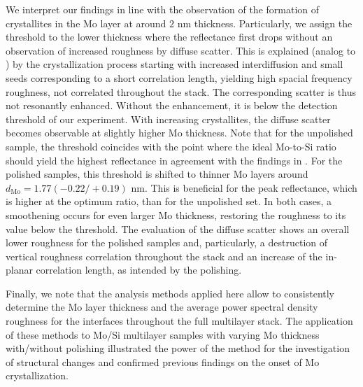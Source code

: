 We interpret our findings in line with the observation of the formation of crystallites in the Mo layer \cite{bajt_investigation_2001} at around $2$ nm thickness. Particularly, we assign the threshold to the lower thickness where the reflectance first drops without an observation of increased roughness by diffuse scatter. This is explained (analog to \cite{bajt_investigation_2001}) by the crystallization  process starting with increased interdiffusion and small seeds corresponding to a short correlation length, yielding high spacial frequency roughness, not correlated throughout the stack. The corresponding scatter is thus not resonantly enhanced. Without the enhancement, it is below the detection threshold of our experiment. With increasing crystallites, the diffuse scatter becomes observable at slightly higher Mo thickness. Note that for the unpolished sample, the threshold coincides with the point where the ideal Mo-to-Si ratio should yield the highest reflectance in agreement with the findings in \cite{bajt_investigation_2001}. For the polished samples, this threshold is shifted to thinner Mo layers around $d_\text{Mo} = 1.77(-0.22/+0.19)$ nm. This is beneficial for the peak reflectance, which is higher at the optimum ratio, than for the unpolished set. In both cases, a smoothening occurs for even larger Mo thickness, restoring the roughness to its value below the threshold. The evaluation of the diffuse scatter shows an overall lower roughness for the polished samples and, particularly, a destruction of vertical roughness correlation throughout the stack and an increase of the in-planar correlation length, as intended by the polishing. 

Finally, we note that the analysis methods applied here allow to consistently determine the Mo layer thickness and the average power spectral density roughness for the interfaces throughout the full multilayer stack. The application of these methods to Mo/Si multilayer samples with varying Mo thickness with/without polishing illustrated the power of the method for the investigation of structural changes and confirmed previous findings on the onset of Mo crystallization.

